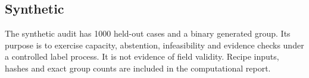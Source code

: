 \subsection{Synthetic}
The synthetic audit has 1000 held-out cases and a binary generated group. Its purpose is to exercise capacity, abstention, infeasibility and evidence checks under a controlled label process. It is not evidence of field validity. Recipe inputs, hashes and exact group counts are included in the computational report.
